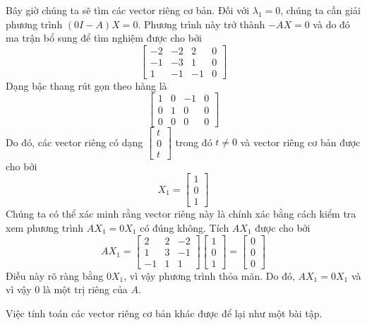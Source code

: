 Bây giờ chúng ta sẽ tìm các vector riêng cơ bản. Đối với $\lambda_{1}=0$, chúng ta cần giải phương trình $(0I-A)X=0$. Phương trình này trở thành $-AX=0$ và do đó ma trận bổ sung để tìm nghiệm được cho bởi
\begin{equation*}
\begin{bmatrix}-2&-2&2&0\\ -1&-3&1&0\\ 1&-1&-1&0\end{bmatrix}
\end{equation*}
Dạng bậc thang rút gọn theo hàng là
\begin{equation*}
\begin{bmatrix}1&0&-1&0\\ 0&1&0&0\\ 0&0&0&0\end{bmatrix}
\end{equation*}
Do đó, các vector riêng có dạng $\begin{bmatrix}t\\ 0\\ t\end{bmatrix}$ trong đó $t\ne0$ và vector riêng cơ bản được cho bởi
\begin{equation*}
X_{1}=\begin{bmatrix}1\\ 0\\ 1\end{bmatrix}
\end{equation*}
Chúng ta có thể xác minh rằng vector riêng này là chính xác bằng cách kiểm tra xem phương trình $AX_{1}=0X_{1}$ có đúng không. Tích $AX_{1}$ được cho bởi
\begin{equation*}
AX_{1}=\begin{bmatrix}2&2&-2\\ 1&3&-1\\ -1&1&1\end{bmatrix}\begin{bmatrix}1\\ 0\\ 1\end{bmatrix}=\begin{bmatrix}0\\ 0\\ 0\end{bmatrix}
\end{equation*}
Điều này rõ ràng bằng $0X_{1}$, vì vậy phương trình thỏa mãn. Do đó, $AX_{1}=0X_{1}$ và vì vậy 0 là một trị riêng của $A$.

Việc tính toán các vector riêng cơ bản khác được để lại như một bài tập.

